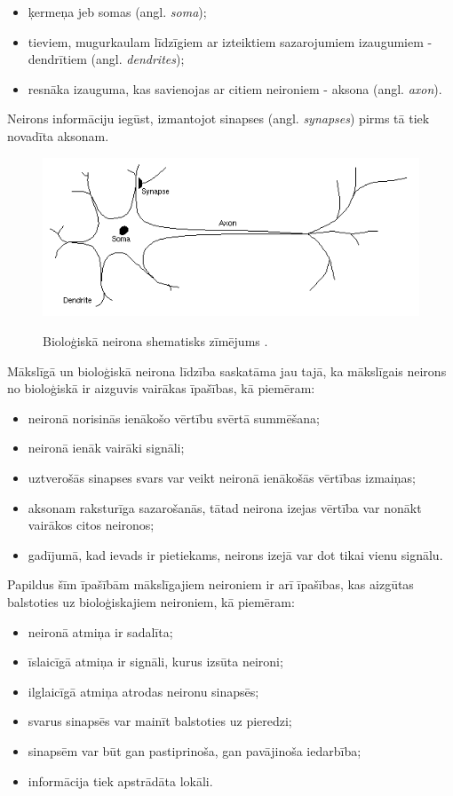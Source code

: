 \documentclass[12pt,paper=a4]{report}
\begin{document}
\begin{itemize}
\item ķermeņa jeb somas (angl. \textit{soma});
\item tieviem, mugurkaulam līdzīgiem ar izteiktiem sazarojumiem izaugumiem - dendrītiem (angl. \textit{dendrites}); 
\item resnāka izauguma, kas savienojas ar citiem neironiem - aksona (angl. \textit{axon}).
\end{itemize}
Neirons informāciju iegūst, izmantojot sinapses (angl. \textit{synapses}) pirms tā tiek novadīta aksonam. \cite{dennis1997introduction}
\begin{figure}[h!]
\centering
\includegraphics[width=.7\linewidth]{neuron}
\label{fig:neuron}
\caption{Bioloģiskā neirona shematisks zīmējums \cite{dennis1997introduction}.}
\end{figure}\par
Mākslīgā un bioloģiskā neirona līdzība saskatāma jau tajā, ka mākslīgais neirons no bioloģiskā ir aizguvis vairākas īpašības, kā piemēram:
\begin{itemize}
\item neironā norisinās ienākošo vērtību svērtā summēšana;
\item neironā ienāk vairāki signāli;
\item uztverošās sinapses svars var veikt neironā ienākošās vērtības izmaiņas;
\item aksonam raksturīga sazarošanās, tātad neirona izejas vērtība var nonākt vairākos citos neironos;
\item gadījumā, kad ievads ir pietiekams, neirons izejā var dot tikai vienu signālu.
\end{itemize}
Papildus šīm īpašībām mākslīgajiem neironiem ir arī īpašības, kas aizgūtas balstoties uz bioloģiskajiem neironiem, kā piemēram:
\begin{itemize}
\item neironā atmiņa ir sadalīta;
\item īslaicīgā atmiņa ir signāli, kurus izsūta neironi;
\item ilglaicīgā atmiņa atrodas neironu sinapsēs;
\item svarus sinapsēs var mainīt balstoties uz pieredzi;
\item sinapsēm var būt gan pastiprinoša, gan pavājinoša iedarbība;
\item informācija tiek apstrādāta lokāli. \cite{fausett1994}
\end{itemize}\par
\end{document}
